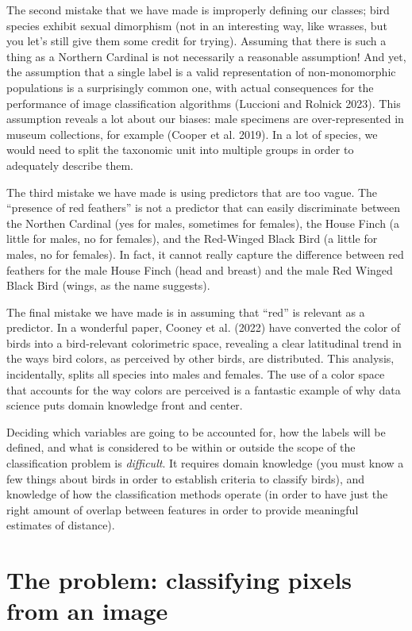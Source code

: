 \documentclass[
  letterpaper,
]{scrbook}
\begin{document}
The second mistake that we have made is improperly defining our classes;
bird species exhibit sexual dimorphism (not in an interesting way, like
wrasses, but you let's still give them some credit for trying). Assuming
that there is such a thing as a Northern Cardinal is not necessarily a
reasonable assumption! And yet, the assumption that a single label is a
valid representation of non-monomorphic populations is a surprisingly
common one, with actual consequences for the performance of image
classification algorithms (Luccioni and Rolnick 2023). This assumption
reveals a lot about our biases: male specimens are over-represented in
museum collections, for example (Cooper et al. 2019). In a lot of
species, we would need to split the taxonomic unit into multiple groups
in order to adequately describe them.

The third mistake we have made is using predictors that are too vague.
The ``presence of red feathers'' is not a predictor that can easily
discriminate between the Northen Cardinal (yes for males, sometimes for
females), the House Finch (a little for males, no for females), and the
Red-Winged Black Bird (a little for males, no for females). In fact, it
cannot really capture the difference between red feathers for the male
House Finch (head and breast) and the male Red Winged Black Bird (wings,
as the name suggests).

The final mistake we have made is in assuming that ``red'' is relevant
as a predictor. In a wonderful paper, Cooney et al. (2022) have
converted the color of birds into a bird-relevant colorimetric space,
revealing a clear latitudinal trend in the ways bird colors, as
perceived by other birds, are distributed. This analysis, incidentally,
splits all species into males and females. The use of a color space that
accounts for the way colors are perceived is a fantastic example of why
data science puts domain knowledge front and center.

Deciding which variables are going to be accounted for, how the labels
will be defined, and what is considered to be within or outside the
scope of the classification problem is \emph{difficult}. It requires
domain knowledge (you must know a few things about birds in order to
establish criteria to classify birds), and knowledge of how the
classification methods operate (in order to have just the right amount
of overlap between features in order to provide meaningful estimates of
distance).

\hypertarget{the-problem-classifying-pixels-from-an-image}{%
\section{The problem: classifying pixels from an
image}\label{the-problem-classifying-pixels-from-an-image}}
\end{document}
